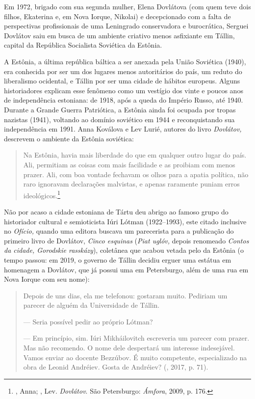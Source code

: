 Em 1972, brigado com sua segunda mulher, Elena Dovlátova (com quem teve
dois filhos, Ekaterina e, em Nova Iorque, Nikolai) e decepcionado com a
falta de perspectivas profissionais de uma Leningrado conservadora e
burocrática, Serguei Dovlátov saiu em busca de um ambiente criativo
menos asfixiante em Tállin, capital da República Socialista Soviética da
Estônia.

A Estônia, a última república báltica a ser anexada pela União Soviética
(1940), era conhecida por ser um dos lugares menos autoritários do país,
um reduto do liberalismo ocidental, e Tállin por ser uma cidade de
hábitos europeus. Alguns historiadores explicam esse fenômeno como um
vestígio dos vinte e poucos anos de independência estoniana: de 1918,
após a queda do Império Russo, até 1940. Durante a Grande Guerra
Patriótica, a Estônia ainda foi ocupada por tropas nazistas (1941),
voltando ao domínio soviético em 1944 e reconquistando sua independência
em 1991. Anna Koválova e Lev Lurié, autores do livro \emph{Dovlátov,}
descrevem o ambiente da Estônia soviética:

\begin{quote}
Na Estônia, havia mais liberdade do que em qualquer outro lugar do país.
Ali, permitiam as coisas com mais facilidade e as proibiam com menos
prazer. Ali, com boa vontade fechavam os olhos para a apatia política,
não raro ignoravam declarações malvistas, e apenas raramente puniam
erros ideológicos.\footnote{, Anna; , Lev. \emph{Dovlátov}.
  São Petersburgo: \emph{Ámfora}, 2009, p. 176.}
\end{quote}

Não por acaso a cidade estoniana de Tártu deu abrigo ao famoso grupo do
historiador cultural e semioticista Iúri Lótman (1922--1993), este
citado inclusive no \emph{Ofício,} quando uma editora buscava um
parecerista para a publicação do primeiro livro de Dovlátov, \emph{Cinco
esquinas} (\emph{Piat uglóv,} depois renomeado \emph{Contos da cidade,
Gorodskie rasskázy}), coletânea que acabou vetada pelo  da
Estônia (o tempo passou: em 2019, o governo de Tállin decidiu erguer uma
estátua em homenagem a Dovlátov, que já possui uma em Petersburgo, além
de uma rua em Nova Iorque com seu nome):

\begin{quote}
Depois de uns dias, ela me telefonou: gostaram muito. Pe­diriam um
parecer de alguém da Universidade de Tállin.

--- Seria possível pedir ao próprio Lótman?

--- Em princípio, sim. Iúri Mikháilovitch escreveria um pa­recer com
prazer. Mas não recomendo. O nome dele despertará um interesse
indesejável. Vamos enviar ao docente Bezzúbov. É muito competente,
especializado na obra de Leonid Andréiev. Gosta de Andréiev? (,
2017, p. 71).
\end{quote}

